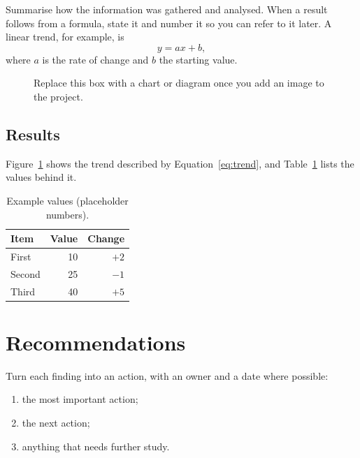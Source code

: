 \documentclass[11pt, a4paper]{report}
\begin{document}
Summarise how the information was gathered and analysed. When a result
follows from a formula, state it and number it so you can refer to it
later. A linear trend, for example, is
\begin{equation}
  y = a x + b ,
  \label{eq:trend}
\end{equation}
where $a$ is the rate of change and $b$ the starting value.

\begin{figure}[htbp]
  \centering
  \caption{Replace this box with a chart or diagram once you add an image to the project.}
  \label{fig:trend}
\end{figure}

\section{Results}
\label{sec:results}

Figure~\ref{fig:trend} shows the trend described by
Equation~\eqref{eq:trend}, and Table~\ref{tab:results} lists the values
behind it.

\begin{table}[htbp]
  \centering
  \begin{tabular}{lrr}
    \toprule
    Item & Value & Change \\
    \midrule
    First & 10 & $+2$ \\
    Second & 25 & $-1$ \\
    Third & 40 & $+5$ \\
    \bottomrule
  \end{tabular}
  \caption{Example values (placeholder numbers).}
  \label{tab:results}
\end{table}

\chapter{Recommendations}
\label{ch:recommendations}

Turn each finding into an action, with an owner and a date where possible:
\begin{enumerate}
  \item the most important action;
  \item the next action;
  \item anything that needs further study.
\end{enumerate}



\end{document}
